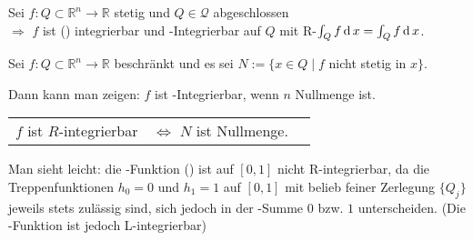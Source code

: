 \begin{proposition}
	Sei $f:Q\subset\mathbb{R}^n\to\mathbb{R}$ stetig und $Q\in\mathcal{Q}$ abgeschlossen \\
	$\Rightarrow$ $f$ ist (\lebesque) integrierbar und -Integrierbar auf $Q$ mit R-$\int_Q f \operatorname{d} x = \int_Q f \operatorname{d} x$.
\end{proposition}

\begin{remark}
	Sei $f:Q\subset\mathbb{R}^n\to\mathbb{R}$ beschränkt und es sei $N:=\{ x\in Q \mid f$ nicht stetig in $x \}$.
	
	Dann kann man zeigen: $f$ ist -Integrierbar, wenn $n$ Nullmenge ist.
	
	\begin{center}
	\begin{tabular}{r@{\ \ }c@{\ \ }l}
		$f$ ist $R$-integrierbar & $\Leftrightarrow$ $N$ ist Nullmenge.
	\end{tabular}
	\end{center}

	Man sieht leicht: die -Funktion () ist auf $[0,1]$ nicht R-integrierbar, da die Treppenfunktionen $h_0 = 0$ und $h_1 = 1$ auf $[0,1]$ mit belieb feiner Zerlegung $\{Q_j\}$ jeweils stets zulässig sind, sich jedoch in der -Summe $0$ bzw. $1$ unterscheiden. (Die -Funktion ist jedoch L-integrierbar)
\end{remark}

